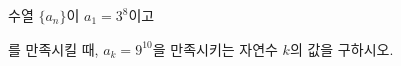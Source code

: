 수열 $\{a_n\}$이 $a_1=3^{8}$이고\par\smallskip{}\par\smallskip\noindent 를 만족시킬 때, $a_k=9^{10}$을 만족시키는 자연수 $k$의 값을 구하시오.
